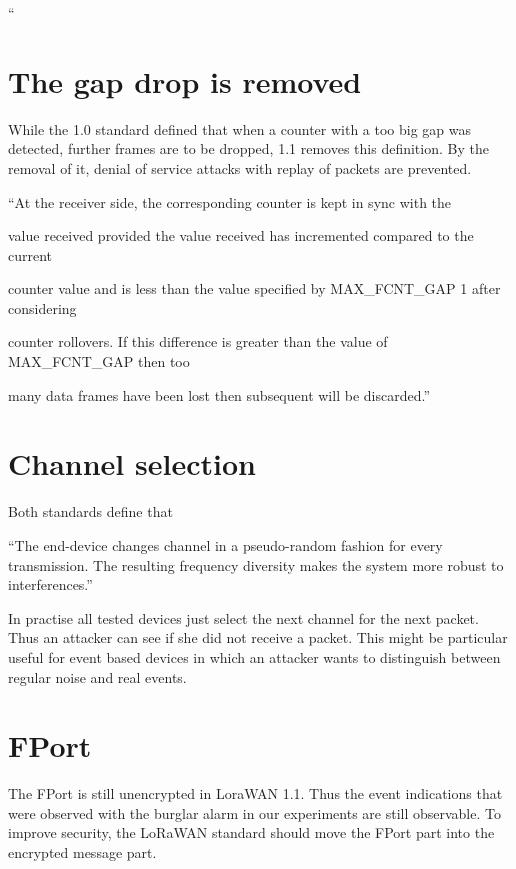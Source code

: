 {{``}

\hypertarget{h.6wjpqn9cabfu}{\section{\texorpdfstring{{The gap drop
is removed}}{The gap drop is removed}}\label{h.6wjpqn9cabfu}}

{While the 1.0 standard defined that when a counter with a too big gap
was detected, further frames are to be dropped, 1.1 removes this
definition. By the removal of it, denial of service attacks with replay
of packets are prevented.}

{``At the receiver side, the corresponding counter is kept in sync with
the}

{value received provided the value received has incremented compared to
the current}

{counter value and is less than the value specified by MAX\_FCNT\_GAP 1
after considering}

{counter rollovers. If this difference is greater than the value of
MAX\_FCNT\_GAP then too}

{many data frames have been lost then subsequent will be discarded.''}

\hypertarget{h.7ctbv6nd7du7}{\section{\texorpdfstring{{Channel
selection}}{Channel selection}}\label{h.7ctbv6nd7du7}}

{Both standards define that }

{``The end-device changes channel in a pseudo-random fashion for every
transmission. The resulting frequency diversity makes the system more
robust to interferences.''}

{In practise all tested devices just select the next channel for the
next packet. Thus an attacker can see if she did not receive a packet.
This might be particular useful for event based devices in which an
attacker wants to distinguish between regular noise and real events.}

\hypertarget{h.i6r97yb5iafg}{\section{\texorpdfstring{{FPort}}{FPort}}\label{h.i6r97yb5iafg}}

{The FPort is still unencrypted in LoraWAN 1.1. Thus the event
indications that were observed with the burglar alarm in our experiments
are still observable. To improve security, the LoRaWAN standard should
move the FPort part into the encrypted message part.}

}
